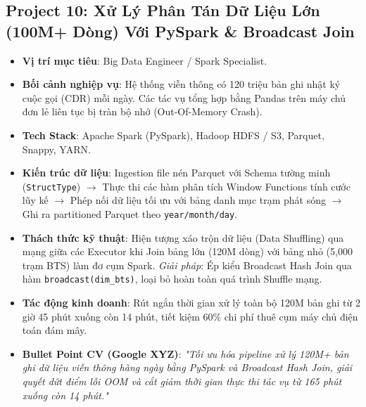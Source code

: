 \subsection{Project 10: Xử Lý Phân Tán Dữ Liệu Lớn (100M+ Dòng) Với PySpark \& Broadcast Join}
\begin{itemize}
    \item \textbf{Vị trí mục tiêu}: Big Data Engineer / Spark Specialist.
    \item \textbf{Bối cảnh nghiệp vụ}: Hệ thống viễn thông có 120 triệu bản ghi nhật ký cuộc gọi (CDR) mỗi ngày. Các tác vụ tổng hợp bằng Pandas trên máy chủ đơn lẻ liên tục bị tràn bộ nhớ (Out-Of-Memory Crash).
    \item \textbf{Tech Stack}: Apache Spark (PySpark), Hadoop HDFS / S3, Parquet, Snappy, YARN.
    \item \textbf{Kiến trúc dữ liệu}: Ingestion file nén Parquet với Schema tường minh (\texttt{StructType}) $\rightarrow$ Thực thi các hàm phân tích Window Functions tính cước lũy kế $\rightarrow$ Phép nối dữ liệu tối ưu với bảng danh mục trạm phát sóng $\rightarrow$ Ghi ra partitioned Parquet theo \texttt{year/month/day}.
    \item \textbf{Thách thức kỹ thuật}: Hiện tượng xáo trộn dữ liệu (Data Shuffling) qua mạng giữa các Executor khi Join bảng lớn (120M dòng) với bảng nhỏ (5,000 trạm BTS) làm đơ cụm Spark. \textit{Giải pháp}: Ép kiểu Broadcast Hash Join qua hàm \texttt{broadcast(dim\_bts)}, loại bỏ hoàn toàn quá trình Shuffle mạng.
    \item \textbf{Tác động kinh doanh}: Rút ngắn thời gian xử lý toàn bộ 120M bản ghi từ 2 giờ 45 phút xuống còn 14 phút, tiết kiệm 60\% chi phí thuê cụm máy chủ điện toán đám mây.
    \item \textbf{Bullet Point CV (Google XYZ)}: \textit{"Tối ưu hóa pipeline xử lý 120M+ bản ghi dữ liệu viễn thông hàng ngày bằng PySpark và Broadcast Hash Join, giải quyết dứt điểm lỗi OOM và cắt giảm thời gian thực thi tác vụ từ 165 phút xuống còn 14 phút."}
\end{itemize}

